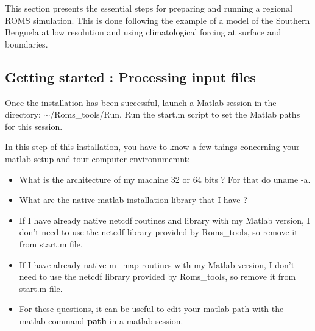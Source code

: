 This section presents the essential steps for preparing and running a regional ROMS
simulation. This is done following the example of a model of the Southern Benguela at
low resolution and using climatological forcing at surface and boundaries.
 
\subsection{Getting started : Processing input files}

Once the installation has been successful, launch a Matlab session in
the directory: $\sim$/Roms\_tools/Run. Run the start.m script to set
the Matlab paths for this session.


In this step of this installation, you have to know a few things concerning your
matlab setup and tour computer environnmemnt:
\begin{itemize}
\item What is the architecture of my machine 32 or 64 bits ? For that do uname -a.
\item What are the native matlab installation library that I have ?
\item If I have already native netcdf routines and library with my Matlab version, I
  don't need to use the netcdf library provided by Roms\_tools, so remove it from
  start.m file.
\item If I have already native m\_map routines with my Matlab version, I don't need to
  use the netcdf library provided by Roms\_tools, so remove it from start.m file.
\item For these questions, it can be useful to edit your
  matlab path with the matlab command \textbf{path} in a matlab session. \\
\end{itemize}

